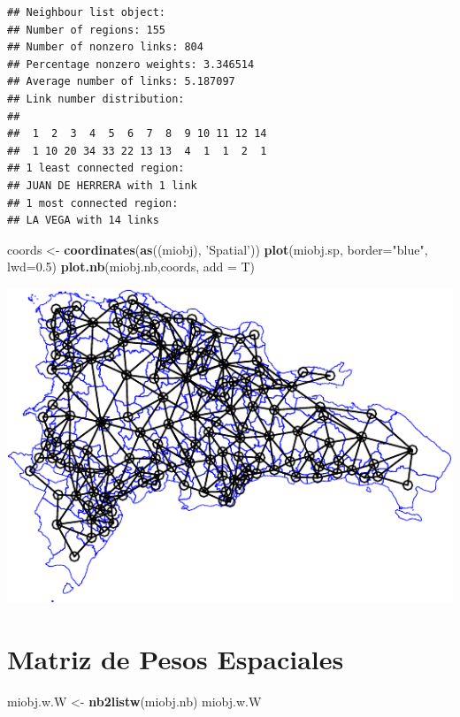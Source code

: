 \documentclass[11pt,]{article}
\newenvironment{Shaded}{\begin{snugshade}}{\end{snugshade}}
\newcommand{\KeywordTok}[1]{\textcolor[rgb]{0.13,0.29,0.53}{\textbf{#1}}}
\newcommand{\DataTypeTok}[1]{\textcolor[rgb]{0.13,0.29,0.53}{#1}}
\newcommand{\FloatTok}[1]{\textcolor[rgb]{0.00,0.00,0.81}{#1}}
\newcommand{\StringTok}[1]{\textcolor[rgb]{0.31,0.60,0.02}{#1}}
\newcommand{\NormalTok}[1]{#1}
\begin{document}
\begin{verbatim}
## Neighbour list object:
## Number of regions: 155 
## Number of nonzero links: 804 
## Percentage nonzero weights: 3.346514 
## Average number of links: 5.187097 
## Link number distribution:
## 
##  1  2  3  4  5  6  7  8  9 10 11 12 14 
##  1 10 20 34 33 22 13 13  4  1  1  2  1 
## 1 least connected region:
## JUAN DE HERRERA with 1 link
## 1 most connected region:
## LA VEGA with 14 links
\end{verbatim}

\begin{Shaded}
\begin{Highlighting}[]
\NormalTok{coords <-}\StringTok{ }\KeywordTok{coordinates}\NormalTok{(}\KeywordTok{as}\NormalTok{((miobj), }\StringTok{'Spatial'}\NormalTok{))}
\KeywordTok{plot}\NormalTok{(miobj.sp, }\DataTypeTok{border=}\StringTok{"blue"}\NormalTok{, }\DataTypeTok{lwd=}\FloatTok{0.5}\NormalTok{)}
\KeywordTok{plot.nb}\NormalTok{(miobj.nb,coords, }\DataTypeTok{add =}\NormalTok{ T)}
\end{Highlighting}
\end{Shaded}

\includegraphics{proyecto_files/figure-latex/unnamed-chunk-22-1.pdf}

\section{Matriz de Pesos Espaciales}\label{matriz-de-pesos-espaciales}

\begin{Shaded}
\begin{Highlighting}[]
\NormalTok{miobj.w.W <-}\StringTok{ }\KeywordTok{nb2listw}\NormalTok{(miobj.nb)}
\NormalTok{miobj.w.W}
\end{Highlighting}
\end{Shaded}
\end{document}
